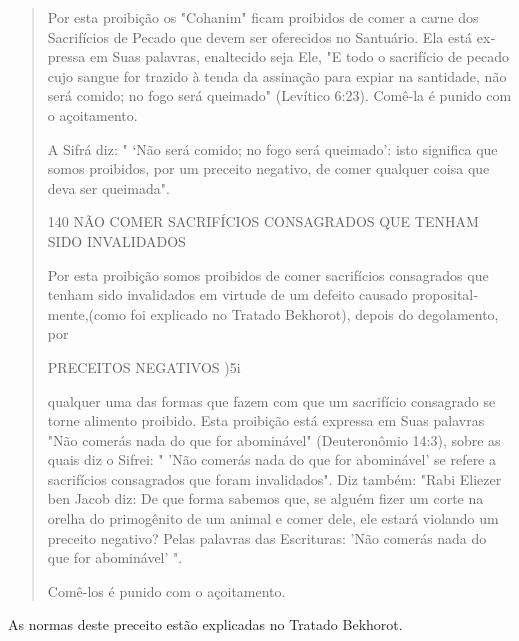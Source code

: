 \begin{quote}
Por esta proibição os "Cohanim" ficam proibidos de comer a carne dos
Sacrifícios de Pecado que devem ser oferecidos no Santuário. Ela está
ex­pressa em Suas palavras, enaltecido seja Ele, "E todo o sacrifício de
pecado cu­jo sangue for trazido à tenda da assinação para expiar na
santidade, não será comido; no fogo será queimado" (Levítico 6:23).
Comê-la é punido com o açoitamento.

A Sifrá diz: " `Não será comido; no fogo será queimado': isto signifi­ca
que somos proibidos, por um preceito negativo, de comer qualquer coisa
que deva ser queimada".

140 NÃO COMER SACRIFÍCIOS CONSAGRADOS QUE TENHAM SIDO INVALIDADOS

Por esta proibição somos proibidos de comer sacrifícios consagra­dos que
tenham sido invalidados em virtude de um defeito causado
proposital­mente,(como foi explicado no Tratado Bekhorot), depois do
degolamento, por

PRECEITOS NEGATIVOS )5i

qualquer uma das formas que fazem com que um sacrifício consagrado se
tor­ne alimento proibido. Esta proibição está expressa em Suas palavras
"Não co­merás nada do que for abominável" (Deuteronômio 14:3), sobre as
quais diz o Sifrei: " 'Não comerás nada do que for abominável' se refere
a sacrifícios con­sagrados que foram invalidados". Diz também: "Rabi
Eliezer ben Jacob diz: De que forma sabemos que, se alguém fizer um
corte na orelha do primogênito de um animal e comer dele, ele estará
violando um preceito negativo? Pelas palavras das Escrituras: 'Não
comerás nada do que for abominável' ".

Comê-los é punido com o açoitamento.
\end{quote}

As normas deste preceito estão explicadas no Tratado Bekhorot.

